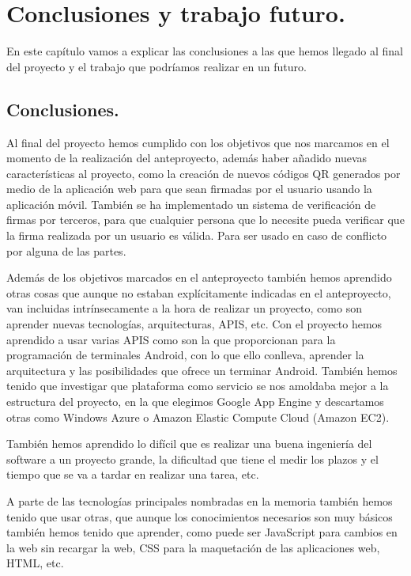 \chapter{Conclusiones y trabajo futuro.}

En este capítulo vamos a explicar las conclusiones a las que hemos llegado al final del proyecto y el trabajo que podríamos realizar en un futuro.

\section{Conclusiones.}

Al final del proyecto hemos cumplido con los objetivos que nos marcamos en el momento de la realización del anteproyecto, además haber añadido nuevas características al proyecto, como la creación de nuevos códigos QR generados por medio de la aplicación web para que sean firmadas por el usuario usando la aplicación móvil. También se ha implementado un sistema de verificación de firmas por terceros, para que cualquier persona que lo necesite pueda verificar que la firma realizada por un usuario es válida. Para ser usado en caso de conflicto por alguna de las partes.

Además de los objetivos marcados en el anteproyecto también hemos aprendido otras cosas que aunque no estaban explícitamente indicadas en el anteproyecto, van incluidas intrínsecamente a la hora de realizar un proyecto, como son aprender nuevas tecnologías, arquitecturas, APIS, etc. Con el proyecto hemos aprendido a usar varias APIS como son la que proporcionan para la programación de terminales Android, con lo que ello conlleva, aprender la arquitectura y las posibilidades que ofrece un terminar Android. También hemos tenido que investigar que plataforma como servicio se nos amoldaba mejor a la estructura del proyecto, en la que elegimos Google App Engine y descartamos otras como Windows Azure o Amazon Elastic Compute Cloud (Amazon EC2).

También hemos aprendido lo difícil que es realizar una buena ingeniería del software a un proyecto grande, la dificultad que tiene el medir los plazos y el tiempo que se va a tardar en realizar una tarea, etc.

A parte de las tecnologías principales nombradas en la memoria también hemos tenido que usar otras, que aunque los conocimientos necesarios son muy básicos también hemos tenido que aprender, como puede ser JavaScript para cambios en la web sin recargar la web, CSS para la maquetación de las aplicaciones web, HTML, etc.

